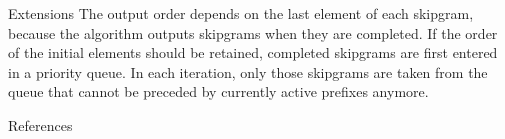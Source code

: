 \documentclass[final]{beamer}
\begin{document}
\begin{frame}[t]
\begin{columns}[t]
\begin{column}{0.3\textwidth}
\begin{block}{Extensions}
        The output order depends on the last element of each skipgram,
        because the algorithm outputs skipgrams when they are completed.
        If the \alert{order of the initial elements} should be retained,
        completed skipgrams are first entered in a \alert{priority queue}.
        In each iteration, only those skipgrams are taken from the queue
        that cannot be preceded by currently active prefixes anymore.
      \end{block}

      \begin{block}{References}
          \printbibliography
      \end{block}
    \end{column}
  \end{columns}

\end{frame} %
\end{document}
